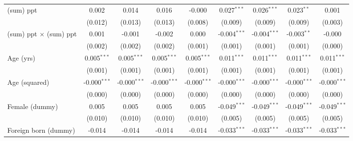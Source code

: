 \documentclass[12pt]{article}
\newcommand{\sym}[1]{\ensuremath{^{#1}}}
\begin{document}
\begin{appendices}
\begin{table}[h!]
\begin{tabular}{l*{8}{c}}
(sum) ppt           &       0.002         &       0.014         &       0.016         &      -0.000         &       0.027\sym{***}&       0.026\sym{***}&       0.023\sym{**} &       0.001         \\
                    &     (0.012)         &     (0.013)         &     (0.013)         &     (0.008)         &     (0.009)         &     (0.009)         &     (0.009)         &     (0.003)         \\
(sum) ppt $\times$ (sum) ppt&       0.001         &      -0.001         &      -0.002         &       0.000         &      -0.004\sym{***}&      -0.004\sym{***}&      -0.003\sym{**} &      -0.000         \\
                    &     (0.002)         &     (0.002)         &     (0.002)         &     (0.001)         &     (0.001)         &     (0.001)         &     (0.001)         &     (0.000)         \\
Age (yrs)           &       0.005\sym{***}&       0.005\sym{***}&       0.005\sym{***}&       0.005\sym{***}&       0.011\sym{***}&       0.011\sym{***}&       0.011\sym{***}&       0.011\sym{***}\\
                    &     (0.001)         &     (0.001)         &     (0.001)         &     (0.001)         &     (0.001)         &     (0.001)         &     (0.001)         &     (0.001)         \\
Age (squared)       &      -0.000\sym{***}&      -0.000\sym{***}&      -0.000\sym{***}&      -0.000\sym{***}&      -0.000\sym{***}&      -0.000\sym{***}&      -0.000\sym{***}&      -0.000\sym{***}\\
                    &     (0.000)         &     (0.000)         &     (0.000)         &     (0.000)         &     (0.000)         &     (0.000)         &     (0.000)         &     (0.000)         \\
Female (dummy)      &       0.005         &       0.005         &       0.005         &       0.005         &      -0.049\sym{***}&      -0.049\sym{***}&      -0.049\sym{***}&      -0.049\sym{***}\\
                    &     (0.010)         &     (0.010)         &     (0.010)         &     (0.010)         &     (0.005)         &     (0.005)         &     (0.005)         &     (0.005)         \\
Foreign born (dummy)&      -0.014         &      -0.014         &      -0.014         &      -0.014         &      -0.033\sym{***}&      -0.033\sym{***}&      -0.033\sym{***}&      -0.033\sym{***}\\

\end{tabular}
\end{table}
\end{appendices}
\end{document}
